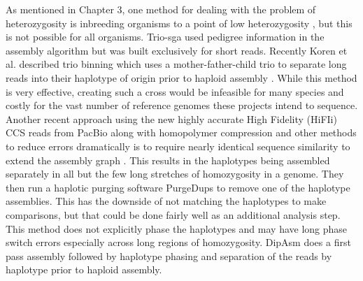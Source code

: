 \par{
As mentioned in Chapter 3, one method for dealing with the problem of heterozygosity is inbreeding organisms to a point of low heterozygosity \cite{drosophila}, 
but this is not possible for all organisms. Trio-sga used pedigree information in the assembly algorithm \cite{trio-sga} 
but was built exclusively for short reads. Recently Koren et al. described trio binning which uses a mother-father-child trio to 
separate long reads into their haplotype of origin prior to haploid assembly \cite{triobinning}. 
While this method is very effective, creating such a cross would be infeasible for many species and costly for the vast number of reference genomes these projects intend to sequence. 
Another recent approach using the new highly accurate High Fidelity (HiFIi) CCS reads from PacBio along with homopolymer compression and other methods to reduce errors dramatically is to 
require nearly identical sequence similarity to extend the assembly graph \cite{HICANU}. This results in the haplotypes being assembled separately in all but the few long stretches of homozygosity in 
a genome. They then run a haplotic purging software PurgeDups \cite{purgedups} to remove one of the haplotype assemblies. This has the downside of not matching the haplotypes to make comparisons, but that could be done 
fairly well as an additional analysis step. This method does not explicitly phase the haplotypes and may have long phase switch errors especially across long regions of homozygosity. DipAsm does a first pass assembly followed by haplotype phasing and separation of the reads by haplotype prior to haploid assembly\cite{Garg2021}.
} 

